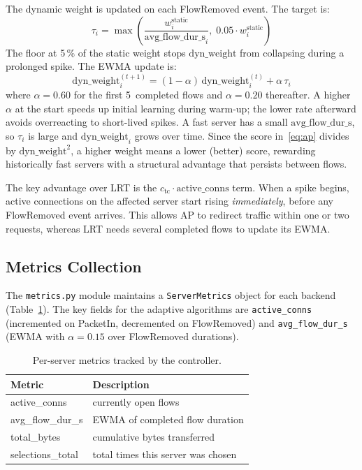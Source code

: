 \documentclass[10pt,a4paper,twocolumn]{article}
\numberwithin{figure}{section}
\numberwithin{table}{section}
\numberwithin{equation}{section}
\begin{document}
The dynamic weight is updated on each FlowRemoved event. The target is:
\begin{equation}
  \tau_i = \max\!\left(\frac{w_i^{\text{static}}}{\text{avg\_flow\_dur\_s}_i},\;
                       0.05 \cdot w_i^{\text{static}}\right)
  \label{eq:target}
\end{equation}
The floor at 5\,\% of the static weight stops $\text{dyn\_weight}$ from
collapsing during a prolonged spike. The EWMA update is:
\begin{equation}
  \text{dyn\_weight}_{i}^{(t+1)} =
    (1-\alpha)\,\text{dyn\_weight}_{i}^{(t)} + \alpha\,\tau_i
  \label{eq:dba}
\end{equation}
where $\alpha = 0.60$ for the first 5~completed flows and $\alpha = 0.20$
thereafter. A higher $\alpha$ at the start speeds up initial learning during
warm-up; the lower rate afterward avoids overreacting to short-lived spikes. A fast
server has a small $\text{avg\_flow\_dur\_s}$, so $\tau_i$ is large and
$\text{dyn\_weight}_i$ grows over time. Since the score in~\eqref{eq:ap}
divides by $\text{dyn\_weight}^2$, a higher weight means a lower (better) score,
rewarding historically fast servers with a structural advantage that persists
between flows.

The key advantage over LRT is the $c_{\mathrm{tc}} \cdot \text{active\_conns}$
term. When a spike begins, active connections on the affected server start rising
\emph{immediately}, before any FlowRemoved event arrives. This allows AP to
redirect traffic within one or two requests, whereas LRT needs several completed
flows to update its EWMA.

\subsection{Metrics Collection}

The \texttt{metrics.py} module maintains a \texttt{ServerMetrics} object for
each backend (Table~\ref{tab:metrics}). The key fields for the adaptive algorithms
are \texttt{active\_conns} (incremented on PacketIn, decremented on FlowRemoved)
and \texttt{avg\_flow\_dur\_s} (EWMA with $\alpha = 0.15$ over FlowRemoved durations).

\begin{table}[t]
\centering\footnotesize
\setlength{\tabcolsep}{4pt}
\caption{Per-server metrics tracked by the controller.}
\label{tab:metrics}
\begin{tabular}{l p{4.2cm}}
\toprule
\textbf{Metric} & \textbf{Description}\\
\midrule
active\_conns     & currently open flows \\
avg\_flow\_dur\_s & EWMA of completed flow duration \\
total\_bytes      & cumulative bytes transferred \\
selections\_total & total times this server was chosen \\
\bottomrule
\end{tabular}
\end{table}
\end{document}
